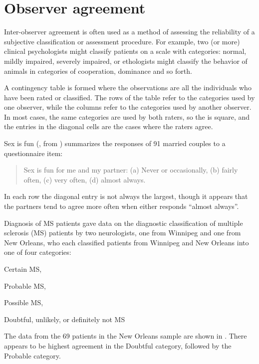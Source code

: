 \section{Observer agreement}\label{sec:twoway-agree}
Inter-observer agreement is often used as a method of assessing the
reliability of a subjective classification or assessment procedure.
For example, two (or more) clinical psychologists might classify
patients on a scale with categories: normal, mildly impaired,
severely impaired, or ethologists might classify the behavior
of animals in categories of cooperation, dominance and so forth.

A contingency table is formed where the observations are all the
individuals who have been rated or classified.  The rows of the table
refer to the categories used by one observer, while the columns
refer to the categories used by another observer.
In most cases, the same categories are used by both raters,
so the \ctab{} is square, and the entries in the diagonal cells
are the cases where the raters agree.

\begin{Example}[sexisfun1]{Sex is fun} 
(\citet[Table 2.10]{Agresti:90}, from \citet{Hout-etal:87})
 summarizes the responses of 91
married couples to a questionnaire item:
\begin{quote}
Sex is fun for me and my partner: (a) Never or occasionally, (b)
fairly often, (c) very often, (d) almost always.
\end{quote}
In each row the diagonal entry is not always the largest, though it
appears that the partners tend to agree more often when either responds
``almost always''.

\end{Example}

\begin{Example}[MS1]{Diagnosis of MS patients}
\citet{LandisKoch:77} gave data on the diagnostic classification
of multiple sclerosis (MS) patients by two neurologists,
one from Winnipeg and one from New Orleans, who each classified
patients from Winnipeg and New Orleans into one of four
categories:
\begin{seriate}
\item Certain MS,
\item Probable MS,
\item Possible MS,
\item Doubtful, unlikely, or definitely not MS
\end{seriate}
The data from the 69 patients in the New Orleans sample are shown in
.
There appears to be highest agreement in the Doubtful category, followed by
the Probable category.

\end{Example}

